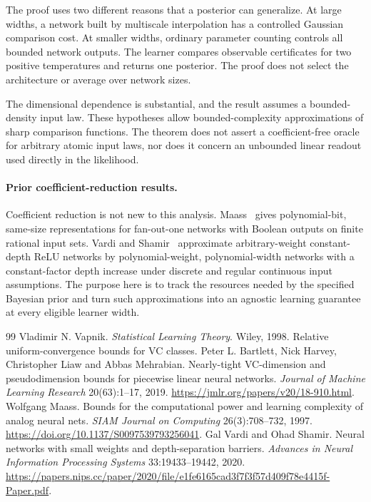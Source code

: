 \documentclass[11pt]{article}
\begin{document}
The proof uses two different reasons that a posterior can generalize. At large widths, a network built by multiscale interpolation has a controlled Gaussian comparison cost. At smaller widths, ordinary parameter counting controls all bounded network outputs. The learner compares observable certificates for two positive temperatures and returns one posterior. The proof does not select the architecture or average over network sizes.

The dimensional dependence is substantial, and the result assumes a bounded-density input law. These hypotheses allow bounded-complexity approximations of sharp comparison functions. The theorem does not assert a coefficient-free oracle for arbitrary atomic input laws, nor does it concern an unbounded linear readout used directly in the likelihood.

\paragraph{Prior coefficient-reduction results.}
Coefficient reduction is not new to this analysis. Maass~\cite{maass} gives polynomial-bit, same-size representations for fan-out-one networks with Boolean outputs on finite rational input sets. Vardi and Shamir~\cite{vardi-shamir} approximate arbitrary-weight constant-depth ReLU networks by polynomial-weight, polynomial-width networks with a constant-factor depth increase under discrete and regular continuous input assumptions. The purpose here is to track the resources needed by the specified Bayesian prior and turn such approximations into an agnostic learning guarantee at every eligible learner width.





\appendix


\begin{thebibliography}{99}
 Vladimir N. Vapnik. \emph{Statistical Learning Theory}. Wiley, 1998. Relative uniform-convergence bounds for VC classes.
 Peter L. Bartlett, Nick Harvey, Christopher Liaw and Abbas Mehrabian. Nearly-tight VC-dimension and pseudodimension bounds for piecewise linear neural networks. \emph{Journal of Machine Learning Research} 20(63):1--17, 2019. \url{https://jmlr.org/papers/v20/18-910.html}.
 Wolfgang Maass. Bounds for the computational power and learning complexity of analog neural nets. \emph{SIAM Journal on Computing} 26(3):708--732, 1997. \url{https://doi.org/10.1137/S0097539793256041}.
 Gal Vardi and Ohad Shamir. Neural networks with small weights and depth-separation barriers. \emph{Advances in Neural Information Processing Systems} 33:19433--19442, 2020. \url{https://papers.nips.cc/paper/2020/file/e1fe6165cad3f7f3f57d409f78e4415f-Paper.pdf}.
\end{thebibliography}
\end{document}
